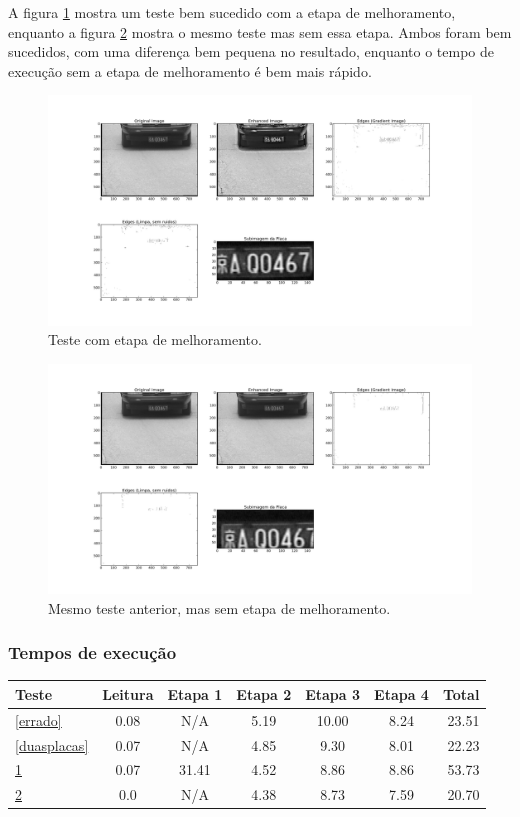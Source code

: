 A figura \ref{comenhance} mostra um teste bem sucedido com a etapa de melhoramento, enquanto
a figura \ref{semenhance} mostra o mesmo teste mas sem essa etapa. Ambos foram bem sucedidos, com
uma diferença bem pequena no resultado, enquanto o tempo de execução sem a etapa de melhoramento é 
bem mais rápido.
\begin{figure}
  \centering
  \includegraphics[clip=true, trim=185 20 150 20, scale=0.4]{displayComEnhance.png}
  \caption{Teste com etapa de melhoramento.}
  \label{comenhance}
\end{figure}

\begin{figure}
  \centering
  \includegraphics[clip=true, trim=185 20 150 20, scale=0.4]{displaySemEnhance.png}
  \caption{Mesmo teste anterior, mas sem etapa de melhoramento.}
  \label{semenhance}
\end{figure}

\subsubsection{Tempos de execução}
\begin{tabular}{ | l | c | c | c | c | c | r | }
\hline
Teste       & Leitura & Etapa 1 & Etapa 2 & Etapa 3 & Etapa 4 & Total \\
\hline
\ref{errado} & 0.08 & N/A & 5.19 & 10.00 & 8.24 & 23.51 \\
\hline
\ref{duasplacas} & 0.07 & N/A & 4.85 & 9.30 & 8.01 & 22.23 \\
\hline
\ref{comenhance} & 0.07 & 31.41 & 4.52 & 8.86 & 8.86 & 53.73 \\
\hline
\ref{semenhance} & 0.0 & N/A & 4.38 & 8.73 & 7.59 & 20.70 \\
\hline
\end{tabular}


